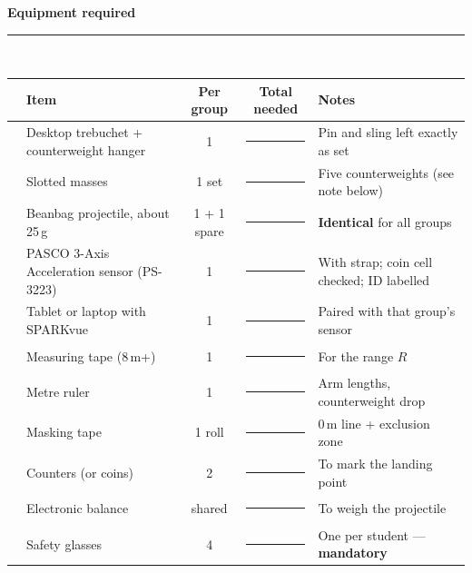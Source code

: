 \documentclass[11pt,a4paper]{article}
\newcommand{\sechead}[1]{%
  \vspace{2pt}%
  {\bfseries\large\color{HeadGrey} #1}\\[-2pt]
  {\color{RuleGrey}\rule{\linewidth}{0.8pt}}\\[2pt]
}
\newcommand{\cb}{\framebox[1.6ex]{\rule{0pt}{1.4ex}}\hspace{0.4em}}
\begin{document}
\sechead{Equipment required}
\begin{tabularx}{\linewidth}{@{}c L{6.3cm} c c X@{}}
\toprule
\textbf{\cb} & \textbf{Item} & \textbf{Per group} & \textbf{Total needed} & \textbf{Notes} \\
\midrule
\cb & Desktop trebuchet + counterweight hanger & 1 & \rule{1.5cm}{0.4pt} & Pin and sling left exactly as set \\
\cb & Slotted masses & 1 set & \rule{1.5cm}{0.4pt} & Five counterweights (see note below) \\
\cb & Beanbag projectile, about 25\,g & 1 + 1 spare & \rule{1.5cm}{0.4pt} & \textbf{Identical} for all groups \\
\cb & PASCO 3-Axis Acceleration sensor (PS-3223) & 1 & \rule{1.5cm}{0.4pt} & With strap; coin cell checked; ID labelled \\
\cb & Tablet or laptop with SPARKvue & 1 & \rule{1.5cm}{0.4pt} & Paired with that group's sensor \\
\cb & Measuring tape (8\,m+) & 1 & \rule{1.5cm}{0.4pt} & For the range $R$ \\
\cb & Metre ruler & 1 & \rule{1.5cm}{0.4pt} & Arm lengths, counterweight drop \\
\cb & Masking tape & 1 roll & \rule{1.5cm}{0.4pt} & 0\,m line + exclusion zone \\
\cb & Counters (or coins) & 2 & \rule{1.5cm}{0.4pt} & To mark the landing point \\
\cb & Electronic balance & shared & \rule{1.5cm}{0.4pt} & To weigh the projectile \\
\cb & Safety glasses & 4 & \rule{1.5cm}{0.4pt} & One per student --- \textbf{mandatory} \\
\bottomrule
\end{tabularx}
\end{document}
